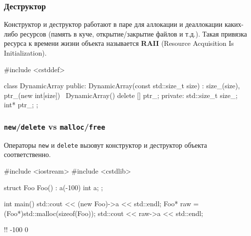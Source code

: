 \documentclass[compress, 8pt, aspectratio=169]{beamer}
\begin{document}
\begin{frame}[fragile]

    \frametitle{Деструктор}

    Конструктор и деструктор работают в паре для аллокации и деаллокации
    каких-либо ресурсов (память в куче, открытие/закрытие файлов и т.д.).
    Такая привязка ресурса к времени жизни объекта называется \textbf{RAII}\footnotemark{}
    (Resource Acquisition Is Initialization).


    \begin{myinplacelisting}[minted language=cpp]
#include <cstddef>

class DynamicArray {
public:
    DynamicArray(const std::size_t size) :
        size_(size), ptr_(new int[size]) {}
    ~DynamicArray() {
        delete [] ptr_;
    }
private:
    std::size_t size_;
    int* ptr_;
};
    \end{myinplacelisting}

\end{frame}

\begin{frame}[fragile]

    \frametitle{\texttt{new}\slash\texttt{delete} vs \texttt{malloc}\slash\texttt{free}}

    Операторы \texttt{new} и \texttt{delete} вызовут конструктор и деструктор
    объекта соответственно.

    \begin{myinplacelisting}[minted language=cpp]
#include <iostream>
#include <cstdlib>

struct Foo {
    Foo() : a(-100) {}
    int a;
};

int main() {
    std::cout << (new Foo)->a << std::endl;
    Foo* raw = (Foo*)std::malloc(sizeof(Foo));
    std::cout << raw->a << std::endl;
}
    \end{myinplacelisting}

    \begin{terminalwindow}
!!
-100
0
    \end{terminalwindow}

\end{frame}
\end{document}
